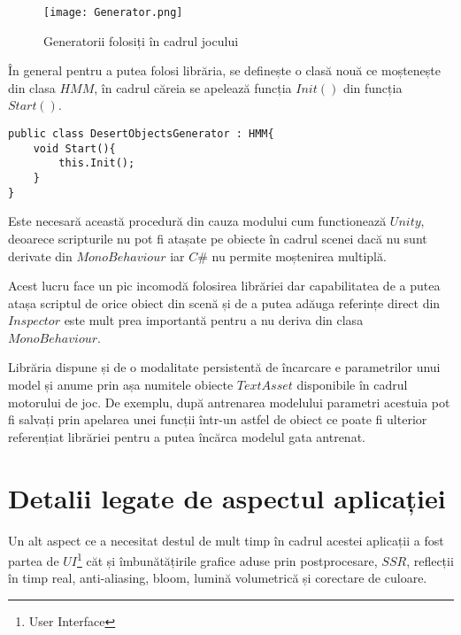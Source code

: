 \vspace{10mm}
\begin{figure}[H]
\centering
\texttt{[image: Generator.png]} \par
\caption{Generatorii folosiți în cadrul jocului}
\end{figure}

În general pentru a putea folosi librăria, se definește o clasă nouă ce moștenește din clasa $HMM$, în cadrul căreia se apelează funcția $Init()$ din funcția $Start()$.\par

\begin{lstlisting}[caption=Exemplu de folosire a librăriei]
public class DesertObjectsGenerator : HMM{
    void Start(){
        this.Init();
    }
}
\end{lstlisting}

Este necesară această procedură din cauza modului cum functionează $Unity$, deoarece scripturile nu pot fi atașate pe obiecte în cadrul scenei dacă nu sunt derivate din $MonoBehaviour$ iar $C\#$ nu permite moștenirea multiplă.\par

Acest lucru face un pic incomodă folosirea librăriei dar capabilitatea de a putea atașa scriptul de orice obiect din scenă și de a putea adăuga referințe direct din $Inspector$ este mult prea importantă pentru a nu deriva din clasa $MonoBehaviour$.\par

Librăria dispune și de o modalitate persistentă de încarcare e parametrilor unui model și anume prin așa numitele obiecte $TextAsset$ disponibile în cadrul motorului de joc. De exemplu, după antrenarea modelului parametri acestuia pot fi salvați prin apelarea unei funcții într-un astfel de obiect ce poate fi ulterior referențiat librăriei pentru a putea încărca modelul gata antrenat.\par

\section{Detalii legate de aspectul aplicației}

Un alt aspect ce a necesitat destul de mult timp în cadrul acestei aplicații a fost partea de $UI$\footnote{User Interface} căt și îmbunătățirile grafice aduse prin postprocesare, $SSR$, reflecții în timp real, anti-aliasing, bloom, lumină volumetrică și corectare de culoare.\par

